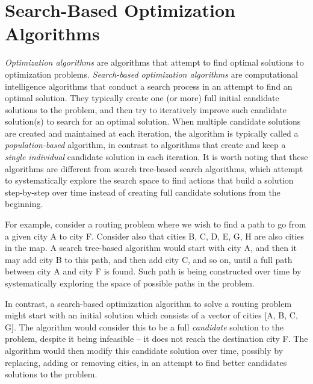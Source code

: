 \section{Search-Based Optimization Algorithms}
\label{sec:alg}

\textit{Optimization algorithms} are algorithms that attempt to find optimal solutions to optimization problems. \textit{Search-based optimization algorithms} are computational intelligence algorithms that conduct a search process in an attempt to find an optimal solution. They typically create one (or more) full initial candidate solutions to the problem, and then try to iteratively improve such candidate solution(s) to search for an optimal solution. When multiple candidate solutions are created and maintained at each iteration, the algorithm is typically called a \textit{population-based} algorithm, in contrast to algorithms that create and keep a \textit{single individual} candidate solution in each iteration. It is worth noting that these algorithms are different from search tree-based search algorithms, which attempt to systematically explore the search space to find actions that build a solution step-by-step over time instead of creating full candidate solutions from the beginning. 

For example, consider a routing problem where we wish to find a path to go from a given city A to city F. Consider also that cities B, C, D, E, G, H are also cities in the map. A search tree-based algorithm would start with city A, and then it may add city B to this path, and then add city C, and so on, until a full path between city A and city F is found. Such path is being constructed over time by systematically exploring the space of possible paths in the problem.

In contrast, a search-based optimization algorithm to solve a routing problem might start with an initial solution which consists of a vector of cities [A, B, C, G]. The algorithm would consider this to be a full \textit{candidate} solution to the problem, despite it being infeasible -- it does not reach the destination city F. The algorithm would then modify this candidate solution over time, possibly by replacing, adding or removing cities, in an attempt to find better candidates solutions to the problem. 

